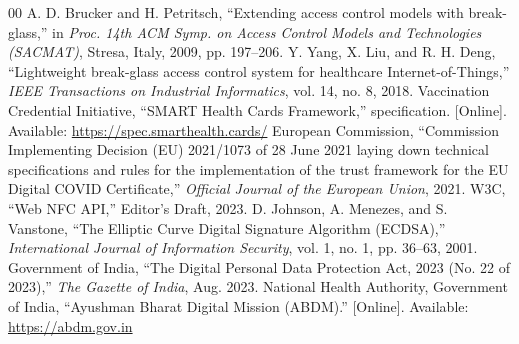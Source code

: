 \documentclass[conference]{IEEEtran}
\begin{document}
\begin{thebibliography}{00}
 A. D. Brucker and H. Petritsch, ``Extending access control models with break-glass,'' in \textit{Proc. 14th ACM Symp. on Access Control Models and Technologies (SACMAT)}, Stresa, Italy, 2009, pp. 197--206.
 Y. Yang, X. Liu, and R. H. Deng, ``Lightweight break-glass access control system for healthcare Internet-of-Things,'' \textit{IEEE Transactions on Industrial Informatics}, vol. 14, no. 8, 2018.
 Vaccination Credential Initiative, ``SMART Health Cards Framework,'' specification. [Online]. Available: \url{https://spec.smarthealth.cards/}
 European Commission, ``Commission Implementing Decision (EU) 2021/1073 of 28 June 2021 laying down technical specifications and rules for the implementation of the trust framework for the EU Digital COVID Certificate,'' \textit{Official Journal of the European Union}, 2021.
 W3C, ``Web NFC API,'' Editor's Draft, 2023.
 D. Johnson, A. Menezes, and S. Vanstone, ``The Elliptic Curve Digital Signature Algorithm (ECDSA),'' \textit{International Journal of Information Security}, vol. 1, no. 1, pp. 36--63, 2001.
 Government of India, ``The Digital Personal Data Protection Act, 2023 (No. 22 of 2023),'' \textit{The Gazette of India}, Aug. 2023.
 National Health Authority, Government of India, ``Ayushman Bharat Digital Mission (ABDM).'' [Online]. Available: \url{https://abdm.gov.in}
\end{thebibliography}
\end{document}
